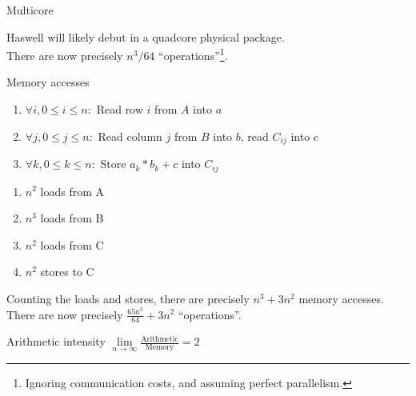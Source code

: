 \documentclass[mathserif,xcolor={dvipsnames,table}]{beamer}
\begin{document}
{
%
\begin{frame}[b]{Multicore}
\scriptsize{
\begin{block}{}
Haswell will likely debut in a quadcore physical package.\\
There are now precisely $n^{3}/64$ ``operations''\footnote{\tiny{Ignoring communication
costs, and assuming perfect parallelism.}}.
\end{block}
\vspace{.1in}
}
\end{frame}
}

\begin{frame}{Memory accesses}
\begin{enumerate}
\item $\forall i, 0\le i \le n:$ Read row $i$ from $A$ into $a$
\item $\forall j, 0\le j \le n:$ Read column $j$ from $B$ into $b$, read $C_{ij}$ into $c$
\item $\forall k, 0\le k \le n:$ Store $a_k * b_k + c$ into $C_{ij}$
\end{enumerate}
\vfill
\begin{enumerate}
\item $n^{2}$ loads from A
\item $n^{3}$ loads from B
\item $n^{2}$ loads from C
\item $n^{2}$ stores to C
\end{enumerate}
Counting the loads and stores, there are precisely $n^{3} + 3n^{2}$ memory
accesses. There are now precisely $\frac{65n^{3}}{64} + 3n^{2}$ ``operations''.
\vfill
\begin{alertblock}{Arithmetic intensity}
\center$\lim\limits_{n \to \infty} \frac{\text{Arithmetic}}{\text{Memory}} = 2$
\end{alertblock}
\vfill
\end{frame}
\end{document}
